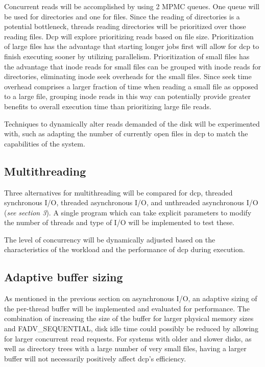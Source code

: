 \documentclass[12pt]{article}
\begin{document}
Concurrent reads will be accomplished by using 2 MPMC queues.
One queue will be used for directories and one for files.
Since the reading of directories is a potential bottleneck, threads
reading directories will be prioritized over those reading files.
Dcp will explore prioritizing reads based on file size.
Prioritization of large files has the advantage that starting
longer jobs first will allow for dcp to finish executing sooner
by utilizing parallelism.
Prioritization of small files has the advantage that
inode reads for small files can be grouped with inode reads for
directories, eliminating inode seek overheads for the small files.
Since seek time overhead comprises a larger fraction of time when
reading a small file as opposed to a large file, grouping inode
reads in this way can potentially provide greater benefits to
overall execution time than prioritizing large file reads.

Techniques to dynamically alter reads demanded of the disk will be
experimented with, such as adapting the number of currently open files
in dcp to match the capabilities of the system.

\subsection{Multithreading}
Three alternatives for multithreading will be compared for dcp,
threaded synchronous I/O, threaded asynchronous I/O, and unthreaded
asynchronous I/O (\textit{see section 3}). A single program which
can take explicit parameters to modify the number of threads and
type of I/O will be implemented to test these.

The level of concurrency will be dynamically adjusted based
on the characteristics of the workload and the performance
of dcp during execution.

\subsection{Adaptive buffer sizing}
As mentioned in the previous section on asynchronous I/O, an adaptive
sizing of the per-thread buffer will be implemented and evaluated for
performance. The combination of increasing the size of the buffer for
larger physical memory sizes and FADV\_SEQUENTIAL, disk idle time could
possibly be reduced by allowing for larger concurrent read requests.
For systems with older and slower disks, as well as directory trees
with a large number of very small files, having a larger buffer
will not necessarily positively affect dcp's efficiency.
\end{document}
